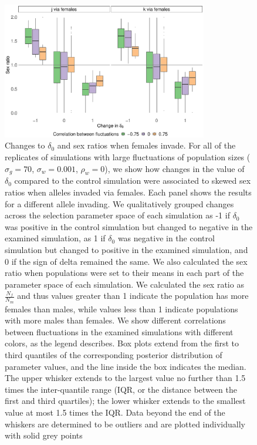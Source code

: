 \documentclass[12pt]{article}
\begin{document}
\clearpage

\begin{figure}[H]
  \centerline{\includegraphics[width=0.8\textwidth]{females.pdf}}
  \caption{Changes to $\delta_{0}$ and sex ratios when females invade. For all of the replicates of simulations with large fluctuations of population sizes ($\sigma_{g}=70$, $\sigma_{w}=0.001$, $\rho_{w}=0$), we show how changes in the value of  $\delta_{0}$ compared to the control simulation were associated to skewed sex ratios when alleles invaded via females. Each panel shows the results for a different allele invading.  We qualitatively grouped changes across the selection parameter space of each simulation as -1 if $\delta_{0}$ was positive in the control simulation but changed to negative in the examined simulation, as 1 if $\delta_{0}$ was negative in the control simulation but changed to positive in the examined simulation, and 0 if the sign of delta remained the same. We also calculated the sex ratio when populations were set to their means in each part of the parameter space of each simulation. We calculated the sex ratio as $\frac{N_{f}}{N_{m}}$ and thus values greater than 1 indicate the population has more females than males, while values less than 1 indicate populations with more males than females. We show different correlations between fluctuations in the examined simulations with different colors, as the legend describes. Box plots extend from the first to third quantiles of the corresponding posterior distribution of parameter values, and the line inside the box indicates the median. The upper whisker extends to the largest value no further than 1.5 times the inter-quantile range (IQR, or the distance between the first and third quartiles); the lower whisker extends to the smallest value at most 1.5 times the IQR. Data beyond the end of the whiskers are determined to be outliers and are plotted individually with solid grey points }

\end{figure}




%
%
\end{document}
